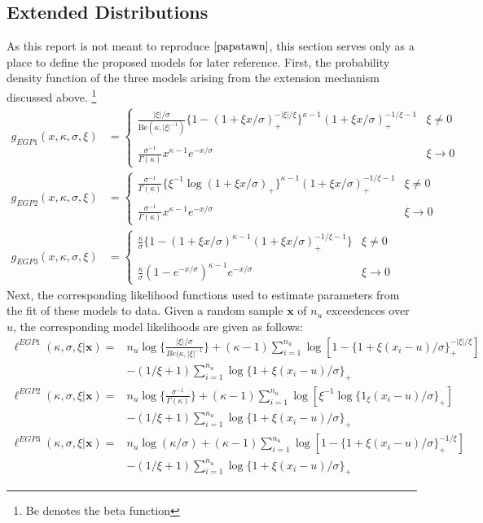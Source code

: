 \documentclass[12pt]{article}
\theoremstyle{definition}
\theoremstyle{definition}
\begin{document}
\subsection{Extended Distributions}
As this report is not meant to reproduce $\cite{papatawn}$, this section serves only as a place to define the proposed models for later reference. First, the probability density function of the three models  arising from the extension mechanism discussed above. \footnote{Be denotes the beta function}
\begin{align*}
g_{EGP1}(x,\kappa,\sigma,\xi)&=\begin{cases} \frac{|\xi|/\sigma}{\text{Be}(\kappa, |\xi|^{-1})}\{1-(1+\xi x/\sigma)_+^{-|\xi|/\xi}\}^{\kappa-1} (1+\xi x/\sigma)_+^{-1/\xi-1} & \xi \neq 0\\\\
    \frac{\sigma^{-1}}{\Gamma(\kappa)}x^{\kappa-1}e^{-x/\sigma} & \xi \rightarrow 0
    \end{cases}\\
g_{EGP2}(x,\kappa,\sigma,\xi)&= \begin{cases}\frac{\sigma^{-1}}{\Gamma(\kappa)}\{\xi^{-1}\log(1+\xi x/\sigma)_+\}^{\kappa-1} (1+\xi x/\sigma)_+^{-1/\xi-1} & \xi\neq 0\\\\
    \frac{\sigma^{-1}}{\Gamma(\kappa)}x^{\kappa-1}e^{-x/\sigma} & \xi\rightarrow 0
    \end{cases}\\
    g_{EGP3}(x,\kappa,\sigma,\xi)&= \begin{cases} \frac{\kappa}{\sigma}\{1-(1+\xi x/\sigma)^{\kappa-1}(1+\xi x/\sigma)_+^{-1/\xi-1}\} & \xi \neq 0\\\\
    \frac{\kappa}{\sigma}(1-e^{-x/\sigma})^{\kappa-1}e^{-x/\sigma} & \xi \rightarrow 0
    \end{cases}
\end{align*}
Next, the corresponding likelihood functions used to estimate parameters from the fit of these models to data. Given a random sample $\boldsymbol x$ of $n_u$ exceedences over $u$, the corresponding model likelihoods are given as follows:
\begin{align*}
    \ell^{EGP1}(\kappa, \sigma,\xi|\boldsymbol{x})=&n_u\log\bigg\{ \frac{|\xi|/\sigma} {Be(\kappa, |\xi|^{-1}}\bigg\}+(\kappa-1)\sum_{i=1}^{n_u}\log[1-\{1+\xi(x_i-u)/\sigma\}_+^{-|\xi|/\xi}]\\
    &-(1/\xi+1)\sum_{i=1}^{n_u}\log\{1+\xi(x_i-u)/\sigma\}_+\\
    \ell^{EGP2}(\kappa, \sigma,\xi|\boldsymbol{x})=&n_u\log\bigg\{ \frac{\sigma^{-1}}{\Gamma(\kappa)}\bigg\}+(\kappa-1)\sum_{i=1}^{n_u}\log[\xi^{-1}\log\{1_\xi(x_i-u)/\sigma\}_+]\\
    &-(1/\xi+1)\sum_{i=1}^{n_u}\log\{1+\xi(x_i-u)/\sigma\}_+\\
    \ell^{EGP3}(\kappa, \sigma,\xi|\boldsymbol{x})=&n_u\log(\kappa/\sigma)+(\kappa-1)\sum_{i=1}^{n_u}\log[1-\{1+\xi(x_i-u)/\sigma\}_+^{-1/\xi}]\\
    &-(1/\xi+1)\sum_{i=1}^{n_u}\log\{1+\xi(x_i-u)/\sigma\}_+
\end{align*}
\end{document}
